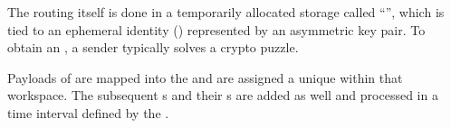 The routing itself is done in a temporarily allocated storage called ``'', which is tied to an ephemeral identity () represented by an asymmetric key pair. To obtain an , a sender typically solves a crypto puzzle. 

Payloads of \VortexMessages{} are mapped into the  and are assigned a unique  within that workspace. The subsequent s and their s are added as well and processed in a time interval defined by the .

